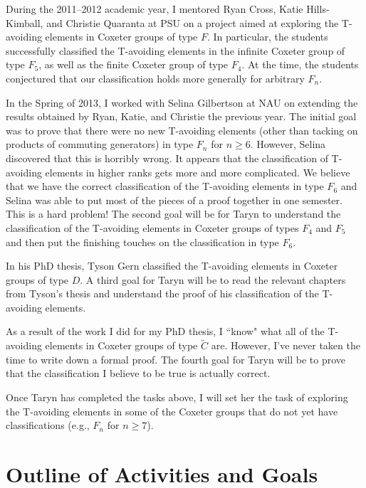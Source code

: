 \documentclass[11pt]{article}
\theoremstyle{definition}
\theoremstyle{remark}
\newcommand{\blankline}{\pagebreak[2]\vspace{.5\baselineskip}}
\begin{document}
\blankline

During the 2011--2012 academic year, I mentored Ryan Cross, Katie Hills-Kimball, and Christie Quaranta at PSU on a project aimed at exploring the T-avoiding elements in Coxeter groups of type $F$.  In particular, the students successfully classified the T-avoiding elements in the infinite Coxeter group of type $F_{5}$, as well as the finite Coxeter group of type $F_{4}$. At the time, the students conjectured that our classification holds more generally for arbitrary $F_{n}$.

\blankline

In the Spring of 2013, I worked with Selina Gilbertson at NAU on extending the results obtained by Ryan, Katie, and Christie the previous year.  The initial goal was to prove that there were no new T-avoiding elements (other than tacking on products of commuting generators) in type $F_n$ for $n\geq 6$.  However, Selina discovered that this is horribly wrong.  It appears that the classification of T-avoiding elements in higher ranks gets more and more complicated.  We believe that we have the correct classification of the T-avoiding elements in type $F_6$ and Selina was able to put most of the pieces of a proof together in one semester.  This is a hard problem!  The second goal will be for Taryn to understand the classification of the T-avoiding elements in Coxeter groups of types $F_4$ and $F_5$ and then put the finishing touches on the classification in type $F_6$.  

\blankline

In his PhD thesis, Tyson Gern classified the T-avoiding elements in Coxeter groups of type $D$. A third goal for Taryn will be to read the relevant chapters from Tyson's thesis and understand the proof of his classification of the T-avoiding elements.  

\blankline

As a result of the work I did for my PhD thesis, I ``know" what all of the T-avoiding elements in Coxeter groups of type $\widetilde{C}$ are.  However, I've never taken the time to write down a formal proof.  The fourth goal for Taryn will be to prove that the classification I believe to be true is actually correct.

\blankline

Once Taryn has completed the tasks above, I will set her the task of exploring the T-avoiding elements in some of the Coxeter groups that do not yet have classifications (e.g., $F_n$ for $n\geq 7$).

\section*{Outline of Activities and Goals}
\end{document}

